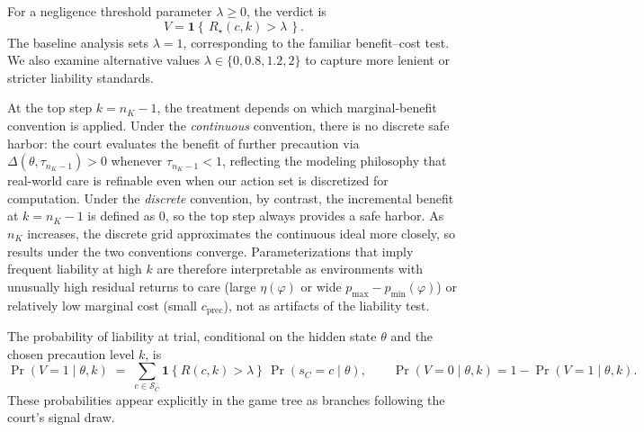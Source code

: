 \documentclass{article}
\begin{document}
For a negligence threshold parameter $\lambda \ge 0$, the verdict is
\[
V=\mathbf{1}\!\left\{\,R_\star(c,k)>\lambda\,\right\}.
\]
The baseline analysis sets $\lambda=1$, corresponding to the familiar benefit–cost test. We also examine alternative values $\lambda\in\{0,0.8,1.2,2\}$ to capture more lenient or stricter liability standards. 

At the top step $k=n_K-1$, the treatment depends on which marginal-benefit convention is applied. Under the \emph{continuous} convention, there is no discrete safe harbor: the court evaluates the benefit of further precaution via $\Delta(\theta,\tau_{n_K-1})>0$ whenever $\tau_{n_K-1}<1$, reflecting the modeling philosophy that real-world care is refinable even when our action set is discretized for computation. Under the \emph{discrete} convention, by contrast, the incremental benefit at $k=n_K-1$ is defined as $0$, so the top step always provides a safe harbor. As $n_K$ increases, the discrete grid approximates the continuous ideal more closely, so results under the two conventions converge. Parameterizations that imply frequent liability at high $k$ are therefore interpretable as environments with unusually high residual returns to care (large $\eta(\varphi)$ or wide $p_{\max}-p_{\min}(\varphi)$) or relatively low marginal cost (small $c_{\mathrm{prec}}$), not as artifacts of the liability test.


The probability of liability at trial, conditional on the hidden state $\theta$ and the chosen precaution level $k$, is
\[
\Pr(V=1\mid \theta,k)\;=\;\sum_{c\in\mathcal{S}_C}\mathbf{1}\!\left\{R(c,k)>\lambda\right\}\,\Pr(s_C=c\mid \theta),
\qquad
\Pr(V=0\mid \theta,k)=1-\Pr(V=1\mid \theta,k).
\]
These probabilities appear explicitly in the game tree as branches following the court’s signal draw.
\end{document}
